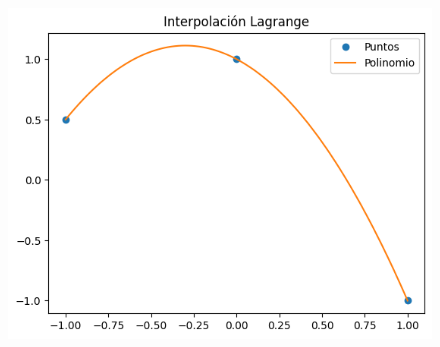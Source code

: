 \begin{frame}
		\begin{figure}[ht!]
			\centering
			\includegraphics[width=.6\paperwidth]{p6-2}
		\end{figure}
	
\end{frame}
